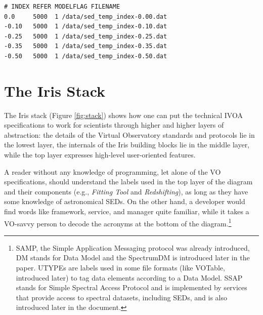 \documentclass[preprint,authoryear,5p]{elsarticle}
\begin{document}
\begin{lstlisting}[style=code,
	caption={Example of template library definition file. Template library definition
	 files are in ASCII format.},
	label=lst:templateconfig]
# INDEX REFER MODELFLAG FILENAME
0.0     5000  1	/data/sed_temp_index-0.00.dat
-0.10   5000  1 /data/sed_temp_index-0.10.dat
-0.25   5000  1 /data/sed_temp_index-0.25.dat
-0.35   5000  1 /data/sed_temp_index-0.35.dat
-0.50   5000  1 /data/sed_temp_index-0.50.dat
\end{lstlisting}

\section{The Iris Stack} \label{sec:stack}

\begin{sloppypar}
The Iris stack (Figure \ref{fig:stack}) shows how one can put the 
technical IVOA specifications to work for scientists through higher and higher
layers of abstraction: the details of the Virtual Observatory
standards and protocols lie in the lowest layer, the internals of the Iris
building blocks lie in the middle layer, while the top layer expresses
high-level user-oriented features.
\end{sloppypar}

A reader without any knowledge of programming, let alone of the VO
specifications, should understand the labels used in the top layer of the
diagram and their components (e.g., \textit{Fitting Tool} and \textit{Redshifting}), as long as they
have some knowledge of astronomical SEDs. On the other hand, a developer would
find words like framework, service, and manager quite familiar, while it takes a
VO-savvy person to decode the acronyms at the bottom of the diagram.\footnote{SAMP,
the Simple Application Messaging protocol was already introduced, DM stands for Data Model and the SpectrumDM
is introduced later in the paper. UTYPEs are labels used in some file formats (like VOTable, introduced later)
to tag data elements according to a Data Model. SSAP stands for Simple Spectral Access Protocol and
is implemented by services that provide access to spectral datasets, including SEDs, and is also introduced later
in the document.}
\end{document}
